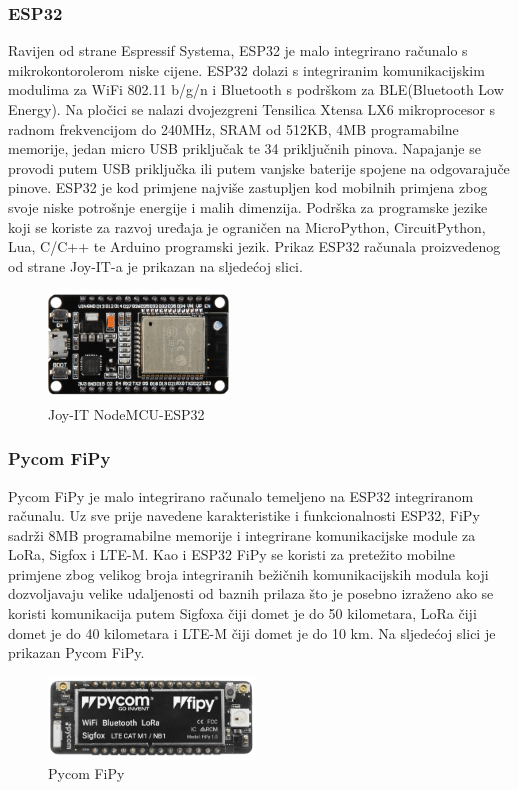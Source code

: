 \documentclass[times, utf8, diplomski]{fer}
\begin{document}
\subsubsection{ESP32}
Ravijen od strane Espressif Systema, ESP32\citep{ESP32} je malo integrirano računalo s mikrokontorolerom niske cijene. ESP32 dolazi s integriranim komunikacijskim modulima za WiFi 802.11 b/g/n i Bluetooth s podrškom za BLE(Bluetooth Low Energy). Na pločici se nalazi dvojezgreni Tensilica Xtensa LX6 mikroprocesor s radnom frekvencijom do 240MHz, SRAM od 512KB, 4MB programabilne memorije, jedan micro USB priključak te 34 priključnih pinova. Napajanje se provodi putem USB priključka ili putem vanjske baterije spojene na odgovarajuče pinove. ESP32 je kod primjene najviše zastupljen kod mobilnih primjena zbog svoje niske potrošnje energije i malih dimenzija. Podrška za programske jezike koji se koriste za razvoj uređaja je ograničen na  MicroPython, CircuitPython, Lua, C/C++ te Arduino programski jezik. Prikaz ESP32 računala proizvedenog od strane Joy-IT-a je prikazan na sljedećoj slici.
\begin{figure}[H]
    \centering
    \includegraphics[width=4.8cm]{images/esp32.png}
    \caption{Joy-IT NodeMCU-ESP32\citep{ESP32Img}}
    \label{fig:esp32}
\end{figure}

\subsubsection{Pycom FiPy}
Pycom FiPy\citep{Fipy} je malo integrirano računalo temeljeno na ESP32 integriranom računalu. Uz sve prije navedene karakteristike i funkcionalnosti ESP32, FiPy sadrži 8MB programabilne memorije i integrirane komunikacijske module za LoRa, Sigfox i LTE-M. Kao i ESP32 FiPy se koristi za pretežito mobilne primjene zbog velikog broja integriranih bežičnih komunikacijskih modula koji dozvoljavaju velike udaljenosti od baznih prilaza što je posebno izraženo ako se koristi komunikacija putem Sigfoxa čiji domet je do 50 kilometara, LoRa čiji domet je do 40 kilometara i LTE-M čiji domet je do 10 km. Na sljedećoj slici je prikazan Pycom FiPy.
\begin{figure}[htb]
    \centering
    \includegraphics[width=5.5cm]{images/fipy.png}
    \caption{Pycom FiPy\citep{Fipy}}
    \label{fig:fipy}
\end{figure}
\end{document}
